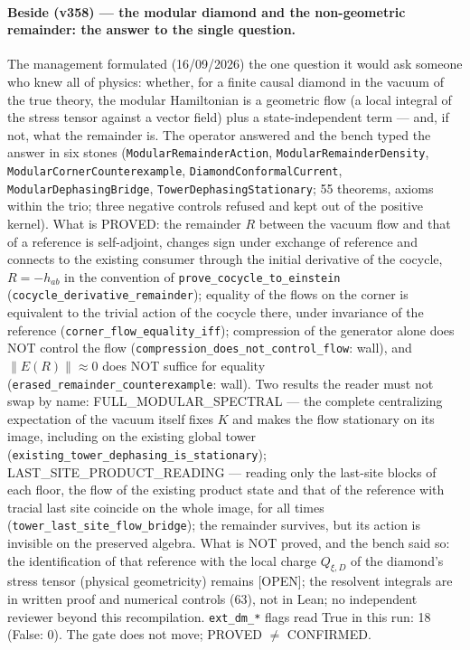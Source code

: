 \documentclass[11pt]{article}
\theoremstyle{definition}\newtheorem{deriv}{Derivation}
\begin{document}
\paragraph*{Beside (v358) --- the modular diamond and the non-geometric remainder: the answer to the single question.} The management formulated (16/09/2026) the one question it would ask someone who knew all of physics: whether, for a finite causal diamond in the vacuum of the true theory, the modular Hamiltonian is a geometric flow (a local integral of the stress tensor against a vector field) plus a state-independent term --- and, if not, what the remainder is. The operator answered and the bench typed the answer in six stones (\texttt{ModularRemainderAction}, \texttt{ModularRemainderDensity}, \texttt{ModularCornerCounterexample}, \texttt{DiamondConformalCurrent}, \texttt{ModularDephasingBridge}, \texttt{TowerDephasingStationary}; 55 theorems, axioms within the trio; three negative controls refused and kept out of the positive kernel). What is PROVED: the remainder $R$ between the vacuum flow and that of a reference is self-adjoint, changes sign under exchange of reference and connects to the existing consumer through the initial derivative of the cocycle, $R=-h_{ab}$ in the convention of \texttt{prove\_cocycle\_to\_einstein} (\texttt{cocycle\_derivative\_remainder}); equality of the flows on the corner is equivalent to the trivial action of the cocycle there, under invariance of the reference (\texttt{corner\_flow\_equality\_iff}); compression of the generator alone does NOT control the flow (\texttt{compression\_does\_not\_control\_flow}: wall), and $\|E(R)\|\approx0$ does NOT suffice for equality (\texttt{erased\_remainder\_counterexample}: wall). Two results the reader must not swap by name: FULL\_MODULAR\_SPECTRAL --- the complete centralizing expectation of the vacuum itself fixes $K$ and makes the flow stationary on its image, including on the existing global tower (\texttt{existing\_tower\_dephasing\_is\_stationary}); LAST\_SITE\_PRODUCT\_READING --- reading only the last-site blocks of each floor, the flow of the existing product state and that of the reference with tracial last site coincide on the whole image, for all times (\texttt{tower\_last\_site\_flow\_bridge}); the remainder survives, but its action is invisible on the preserved algebra. What is NOT proved, and the bench said so: the identification of that reference with the local charge $Q_{\xi,D}$ of the diamond's stress tensor (physical geometricity) remains [OPEN]; the resolvent integrals are in written proof and numerical controls (63), not in Lean; no independent reviewer beyond this recompilation. \texttt{ext\_dm\_*} flags read True in this run: 18 (False: 0). The gate does not move; PROVED $\neq$ CONFIRMED.
\end{document}

